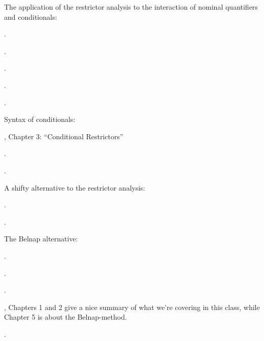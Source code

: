 {The application of the restrictor analysis to the interaction of nominal quantifiers and conditionals:
\begin{bibentrylist}
	\item {}.
	\item {}.
	\item {}.
	\item {}.
	\item {}.
\end{bibentrylist}

Syntax of conditionals:
\begin{bibentrylist}
  \item {}, Chapter 3: ``Conditional Restrictors''
  \item {}.
	\item {}.
\end{bibentrylist}

A shifty alternative to the restrictor analysis:

\begin{bibentrylist}
  \item {}.
  \item {}.
\end{bibentrylist}

The Belnap alternative:

\begin{bibentrylist}
   \item {}.
   \item {}.
   \item {}.
   \item {}, Chapters 1 and 2 give a nice summary of what we're covering in this class, while Chapter 5 is about the Belnap-method.
   \item {}.
\end{bibentrylist}
  

}


